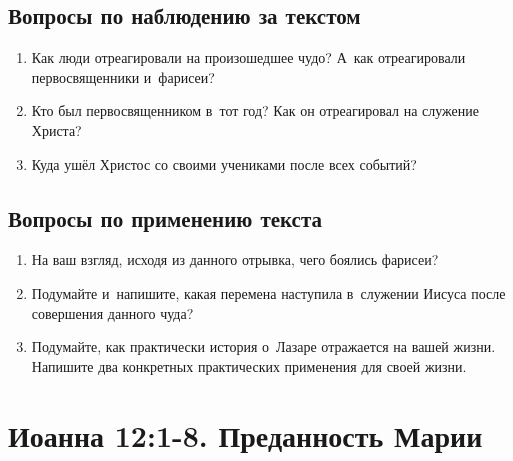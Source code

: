 \documentclass[a4paper,12pt]{article}
\begin{document}
\subsection*{Вопросы по наблюдению за текстом}
\begin{enumerate}
    \item Как люди отреагировали на произошедшее чудо? А~как отреагировали первосвященники и~фарисеи? 
    
    \myline
    
    \myline
    \item Кто был первосвященником в~тот год? Как он отреагировал на служение Христа? 
    
    \myline
    
    \myline
    \item Куда ушёл Христос со своими учениками после всех событий? 
    
    \myline
    
    \myline
\end{enumerate}

\subsection*{Вопросы по применению текста} 
\begin{enumerate}
    \item На ваш взгляд, исходя из данного отрывка, чего боялись фарисеи? 
    
    \myline
    
    \myline
    \item Подумайте и~напишите, какая перемена наступила в~служении Иисуса после совершения данного чуда? 
    
    \myline
    
    \myline
    \item Подумайте, как практически история о~Лазаре отражается на вашей жизни. Напишите два конкретных практических применения для своей жизни. 
    
    \myline
    
    \myline
\end{enumerate}



\section{Иоанна 12:1-8. Преданность Марии}
\end{document}
